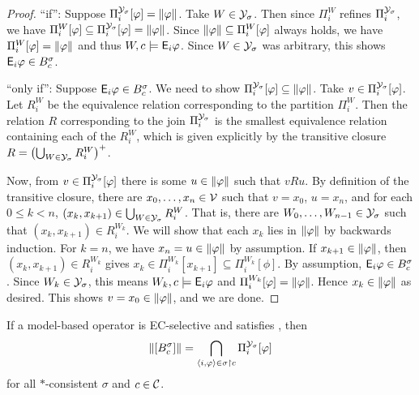 \begin{proof}
    ``if'': Suppose $\Pi^{\mathcal{Y}_\sigma}_i[\varphi] = \|{\varphi}\|$. Take $W \in
    \mathcal{Y}_\sigma$. Then since $\Pi^W_i$ refines $\Pi^{\mathcal{Y}_\sigma}_i$, we have
    $\Pi^W_i[\varphi] \subseteq \Pi^{\mathcal{Y}_\sigma}_i[\varphi] = \|{\varphi}\|$. Since
    $\|{\varphi}\| \subseteq \Pi^W_i[\varphi]$ always holds, we have
    $\Pi^W_i[\varphi] = \|{\varphi}\|$ and thus $W, c \models \mathsf{E}_i\varphi$. Since
    $W \in \mathcal{Y}_\sigma$ was arbitrary, this shows $\mathsf{E}_i\varphi \in B^\sigma_c$.

    ``only if'': Suppose $\mathsf{E}_i\varphi \in B^\sigma_c$. We need to show
    $\Pi^{\mathcal{Y}_\sigma}_i[\varphi] \subseteq \|{\varphi}\|$. Take $v \in
    \Pi^{\mathcal{Y}_\sigma}_i[\varphi]$. Let $R^W_i$ be the equivalence relation
    corresponding to the partition $\Pi^W_i$. Then the relation $R$
    corresponding to the join $\Pi^{\mathcal{Y}_\sigma}_i$ is the smallest equivalence
    relation containing each of the $R^W_i$, which is given explicitly by the
    transitive closure $R = \left(\bigcup_{W \in
    \mathcal{Y}_\sigma}{R^W_i}\right)^+$.

    Now, from $v \in \Pi^{\mathcal{Y}_\sigma}_i[\varphi]$ there is some $u \in
    \|{\varphi}\|$ such that $vRu$. By definition of the transitive closure,
    there are $x_0, \ldots, x_n \in \mathcal{V}$ such that $v = x_0$, $u = x_n$, and
    for each $0 \le k < n$, $(x_k, x_{k + 1}) \in \bigcup_{W \in
    \mathcal{Y}_\sigma}{R^W_i}$. That is, there are $W_0, \ldots, W_{n - 1} \in
    \mathcal{Y}_\sigma$ such that $(x_k, x_{k + 1}) \in R^{W_k}_i$.
    We will show that each $x_k$ lies in $\|{\varphi}\|$ by backwards
    induction. For $k = n$, we have $x_n = u \in \|{\varphi}\|$ by
    assumption. If $x_{k + 1} \in \|{\varphi}\|$, then $(x_k, x_{k + 1}) \in
    R^{W_k}_i$ gives $x_k \in \Pi^{W_k}_i[x_{k + 1}] \subseteq
    \Pi^{W_k}_i[\phi]$. By assumption, $\mathsf{E}_i\varphi \in B^\sigma_c$. Since $W_k
    \in \mathcal{Y}_\sigma$, this means $W_k, c \models \mathsf{E}_i\varphi$ and $\Pi^{W_k}_i[\varphi]
    = \|{\varphi}\|$.  Hence $x_k \in \|{\varphi}\|$ as desired.
    This shows $v = x_0 \in \|{\varphi}\|$, and we are done.  \end{proof}

\begin{proposition}
    \label{kr_prop_ec_selective_propmodels}
    If a model-based operator is EC-selective and satisfies \soundness{}, then
    \[
        \|{\left[{B^\sigma_c}\right]}\|
        =
        \bigcap_{\langle {i, \varphi} \rangle \in \sigma \upharpoonright c}{
            \Pi^{\mathcal{Y}_\sigma}_i[\varphi]
        }
    \]
    for all $\ast$-consistent $\sigma$ and $c \in \mathcal{C}$.
\end{proposition}

